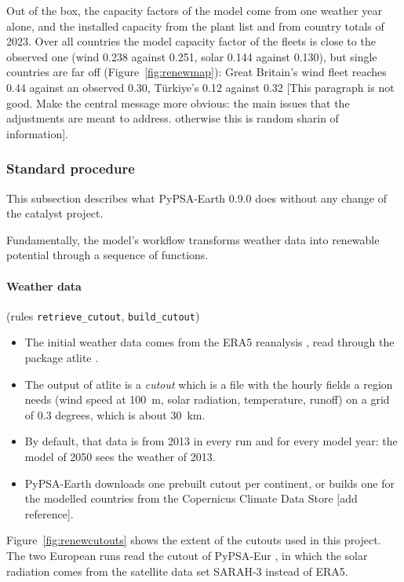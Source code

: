 Out of the box, the capacity factors of the model come from one weather year alone, and the installed capacity from the plant list and from country totals of 2023.
Over all countries the model capacity factor of the fleets is close to the observed one (wind 0.238 against 0.251, solar 0.144 against 0.130), but single countries are far off (Figure~\ref{fig:renewmap}): Great Britain's wind fleet reaches 0.44 against an observed 0.30, Türkiye's 0.12 against 0.32 [This paragraph is not good. Make the central message more obvious: the main issues that the adjustments are meant to address. otherwise this is random sharin of information].

\subsubsection{Standard procedure}\label{sec:renewables-standard}

This subsection describes what PyPSA-Earth 0.9.0 does without any change of the catalyst project.

Fundamentally, the model's workflow transforms weather data into renewable potential through a sequence of functions. 

\paragraph{Weather data} (rules \texttt{retrieve\_cutout}, \texttt{build\_cutout})
\begin{itemize}[nosep,leftmargin=*]
  \item The initial weather data comes from the ERA5 reanalysis \citep{hersbach2020}, read through the package atlite \citep{atlite}.
  \item The output of atlite is a \textit{cutout} which is a file with the hourly fields a region needs (wind speed at \SI{100}{m}, solar radiation, temperature, runoff) on a grid of 0.3 degrees, which is about \SI{30}{km}.
  \item By default, that data is from 2013 in every run and for every model year: the model of 2050 sees the weather of 2013.
  \item PyPSA-Earth downloads one prebuilt cutout per continent, or builds one for the modelled countries from the Copernicus Climate Data Store [add reference].
\end{itemize}
Figure~\ref{fig:renewcutouts} shows the extent of the cutouts used in this project.
The two European runs read the cutout of PyPSA-Eur \citep{horsch2018pypsa}, in which the solar radiation comes from the satellite data set SARAH-3 \citep{sarah3} instead of ERA5.

